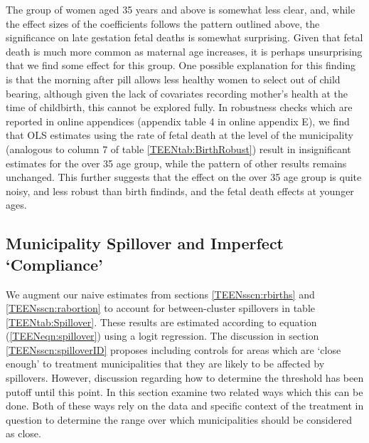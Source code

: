 The group of women aged 35 years and above is somewhat less clear, and, while the 
effect sizes of the coefficients follows the pattern outlined above, the
significance on late gestation fetal deaths is somewhat surprising.  Given that
fetal death is much more common as maternal age increases, it is perhaps 
unsurprising that we find some effect for this group.  One possible explanation
for this finding is that the morning after pill allows less healthy women to 
select out of child bearing, although given the lack of covariates recording 
mother's health at the time of childbirth, this cannot be explored fully.  In
robustness checks which are reported in online appendices (appendix table 4 in
online appendix E), we find that OLS estimates using the rate of fetal death at 
the level of the municipality (analogous to column 7 of table 
\ref{TEENtab:BirthRobust}) result in insignificant estimates for the over 35 age 
group, while the pattern of other results remains unchanged. This further 
suggests that the effect on the over 35 age group is quite noisy, and less robust 
than birth findinds, and the fetal death effects at younger ages.

\subsection{Municipality Spillover and Imperfect `Compliance'}
\label{TEENsscn:spillover}
We augment our naive estimates from sections \ref{TEENsscn:rbirths} and
\ref{TEENsscn:rabortion} to account for between-cluster spillovers in table
\ref{TEENtab:Spillover}.  These results are estimated according to equation
(\ref{TEENeqn:spillover}) using a logit regression.  The discussion in section
\ref{TEENsscn:spilloverID} proposes including controls for areas which are `close 
enough' to treatment municipalities that they are likely to be affected by
spillovers.  However, discussion regarding how to determine the threshold has
been putoff until this point. In this section \person examine two related ways 
which this can be done.  Both of these ways rely on the data and specific context 
of the treatment in question to determine the range over which municipalities 
should be considered as close.

